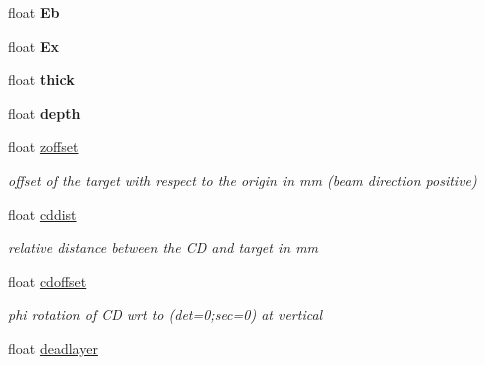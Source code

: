 \begin{DoxyCompactItemize}
\item 
\hypertarget{classg__clx_adacfaa00cabbde7095f23a1cacab7510}{float {\bfseries Eb}}\label{classg__clx_adacfaa00cabbde7095f23a1cacab7510}

\item 
\hypertarget{classg__clx_a1f2096a705a986c48af8540f6eb1b835}{float {\bfseries Ex}}\label{classg__clx_a1f2096a705a986c48af8540f6eb1b835}

\item 
\hypertarget{classg__clx_ada5b4790b6f1970cd350444564604e2f}{float {\bfseries thick}}\label{classg__clx_ada5b4790b6f1970cd350444564604e2f}

\item 
\hypertarget{classg__clx_a55b2ad47323975fbefd70314a1580d26}{float {\bfseries depth}}\label{classg__clx_a55b2ad47323975fbefd70314a1580d26}

\item 
\hypertarget{classg__clx_a85780ae170aef9d5362a47520ee3a822}{float \hyperlink{classg__clx_a85780ae170aef9d5362a47520ee3a822}{zoffset}}\label{classg__clx_a85780ae170aef9d5362a47520ee3a822}

\begin{DoxyCompactList}\small\item\em offset of the target with respect to the origin in mm (beam direction positive) \end{DoxyCompactList}\item 
\hypertarget{classg__clx_af6483d6ed4f21d91fe1ac7e88393ab4e}{float \hyperlink{classg__clx_af6483d6ed4f21d91fe1ac7e88393ab4e}{cddist}}\label{classg__clx_af6483d6ed4f21d91fe1ac7e88393ab4e}

\begin{DoxyCompactList}\small\item\em relative distance between the C\-D and target in mm \end{DoxyCompactList}\item 
\hypertarget{classg__clx_a2f16d48f2601cfd6ccb100283f3cdab7}{float \hyperlink{classg__clx_a2f16d48f2601cfd6ccb100283f3cdab7}{cdoffset}}\label{classg__clx_a2f16d48f2601cfd6ccb100283f3cdab7}

\begin{DoxyCompactList}\small\item\em phi rotation of C\-D wrt to (det=0;sec=0) at vertical \end{DoxyCompactList}\item 
\hypertarget{classg__clx_a9868b722188e951233b134083dd63370}{float \hyperlink{classg__clx_a9868b722188e951233b134083dd63370}{deadlayer}}\label{classg__clx_a9868b722188e951233b134083dd63370}


\end{DoxyCompactItemize}
